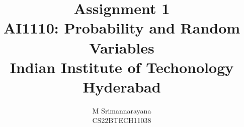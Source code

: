 \documentclass[journal,12pt,twocolumn]{IEEEtran}
\begin{document}
\let\vec\mathbf




\vspace{3cm}

\title{
\textbf {Assignment 1}\\ \large \textbf{AI1110}: Probability and Random Variables\\Indian Institute of Techonology Hyderabad
}
\author{M Srimannarayana\\CS22BTECH11038}
	



%
%
%

% 
%
\end{document}
